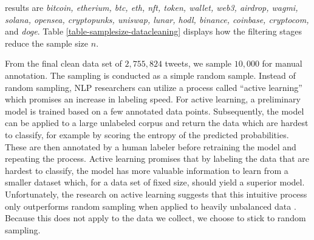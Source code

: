 results are \emph{bitcoin, etherium, btc, eth, nft, token, wallet, web3, airdrop, wagmi, solana, opensea, cryptopunks, uniswap, lunar, hodl, binance, coinbase, cryptocom,} and \emph{doge}. Table \ref{table-samplesize-datacleaning} displays how the filtering stages reduce the sample size $n$.



From the final clean data set of $2,755,824$ tweets, we sample $10,000$ for manual annotation. The sampling is conducted as a simple random sample. Instead of random sampling, NLP researchers can utilize a process called ``active learning'' which promises an increase in labeling speed. For active learning, a preliminary model is trained based on a few annotated data points. Subsequently, the model can be applied to a large unlabeled corpus and return the data which are hardest to classify, for example by scoring the entropy of the predicted probabilities. These are then annotated by a human labeler before retraining the model and repeating the process. Active learning promises that by labeling the data that are hardest to classify, the model has more valuable information to learn from a smaller dataset which, for a data set of fixed size, should yield a superior model. Unfortunately, the research on active learning suggests that this intuitive process only outperforms random sampling when applied to heavily unbalanced data . Because this does not apply to the data we collect, we choose to stick to random sampling.



